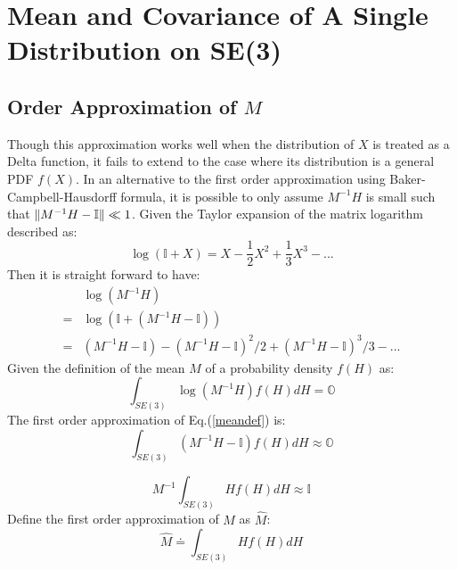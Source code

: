 \documentclass[twocolumn,10pt]{asme2ej}
\DeclarePairedDelimiter{\norm}{\lVert}{\rVert}
\newcommand{\II}{\mathbb{I}}
\begin{document}
\section{Mean and Covariance of A Single Distribution on SE(3)}


\subsection{Order Approximation of $M$}
Though this approximation works well when the distribution of $X$ is treated as a Delta function, it fails to extend to the case where its distribution is a general PDF $f(X)$. In an alternative to the first order approximation using Baker-Campbell-Hausdorff formula, it is possible to only assume $M^{-1}H$ is small such that $\norm{M^{-1}H - \II} \ll 1$. Given the Taylor expansion of the matrix logarithm described as:
\begin{equation}
\log(\II + X) = X - \dfrac{1}{2}X^2 + \dfrac{1}{3}X^3 - ...
\end{equation}
Then it is straight forward to have:
\begin{equation}
\begin{split}
&\log(M^{-1}H) \\ 
= &\log(\II + (M^{-1}H - \II)) \\ 
= &\left(M^{-1}H - \II \right) - \left(M^{-1}H - \II \right)^2/2 + \left(M^{-1}H - \II \right)^3/3 - ...
\end{split}
\end{equation}
Given the definition of the mean $M$ of a probability density $f(H)$ as:
\begin{equation} 
\int_{SE(3)} \log(M^{-1} H) f(H) dH = \mathbb{O}  
\label{meandef} 
\end{equation}
The first order approximation of Eq.(\ref{meandef}) is:
\begin{equation}
\int_{SE(3)} (M^{-1}H - \II) f(H)dH \approx \mathbb{O}
\end{equation}

\begin{equation}
M^{-1}\int_{SE(3)} H f(H)dH \approx \II
\end{equation}
Define the first order approximation of $M$ as $\widehat{M}$:
\begin{equation}
\widehat{M} \doteq \int_{SE(3)}Hf(H)dH
\label{1st}
\end{equation}
\end{document}
